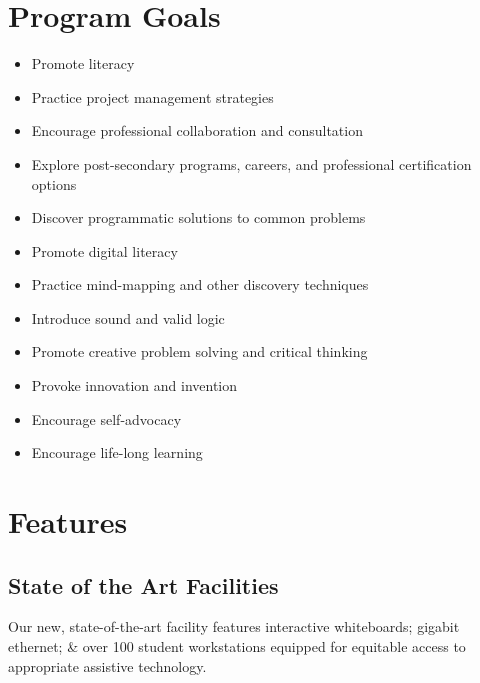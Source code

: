 \documentclass[letterpaper,10pt,english]{sphinxmanual}
\begin{document}
\section{Program Goals}
\label{description:program-goals}\begin{itemize}
\item {} 
Promote literacy

\item {} 
Practice project management strategies

\item {} 
Encourage professional collaboration and consultation

\item {} 
Explore post-secondary programs, careers, and professional certification options

\item {} 
Discover programmatic solutions to common problems

\item {} 
Promote digital literacy

\item {} 
Practice mind-mapping and other discovery techniques

\item {} 
Introduce sound and valid logic

\item {} 
Promote creative problem solving and critical thinking

\item {} 
Provoke innovation and invention

\item {} 
Encourage self-advocacy

\item {} 
Encourage life-long learning

\end{itemize}


\section{Features}
\label{description:features}

\subsection{State of the Art Facilities}
\label{description:state-of-the-art-facilities}
Our new, state-of-the-art facility features interactive whiteboards; gigabit ethernet; \& over 100 student workstations equipped for equitable access to appropriate assistive technology.
\end{document}
